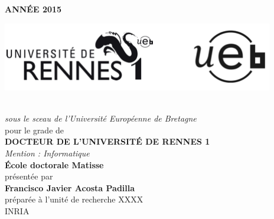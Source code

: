 {\selectfont
\thispagestyle{empty}
\begin{minipage}{\textwidth}
\vspace{-7cm}
\hfill
\textbf{ANN\'EE 2015}
\end{minipage}

\vspace{-3.5cm}\hspace{-2cm}
 	\center
\includegraphics[height=30mm]{Logos.png} %

\vspace{.7cm}
\begin{center}
\begin{minipage}{\textwidth}
\\ \vspace{0mm}\emph{\large sous le sceau de l'Universit\'e Europ\'eenne de Bretagne}\\
\vspace{0.5cm}
{\large pour le grade de}\\ \vspace{2mm}
{\Large\bfseries  DOCTEUR DE L'UNIVERSIT\'E DE RENNES 1}\\ \vspace{0.4cm}
\emph{\large Mention : Informatique}\\ \vspace{2mm}
{\Large\bfseries  \'Ecole doctorale Matisse}\\ \vspace{0.5cm}
{\large pr\'esent\'ee par} \\ \vspace{3mm}
{\Huge\bfseries Francisco Javier Acosta Padilla}\\ \vspace{0.6cm}
{\large pr\'epar\'ee \`a l'unit\'e de recherche XXXX\\}
{\large\vspace{0.00cm}INRIA\\}
\end{minipage}
\vspace{0.3cm}


\end{center}}
